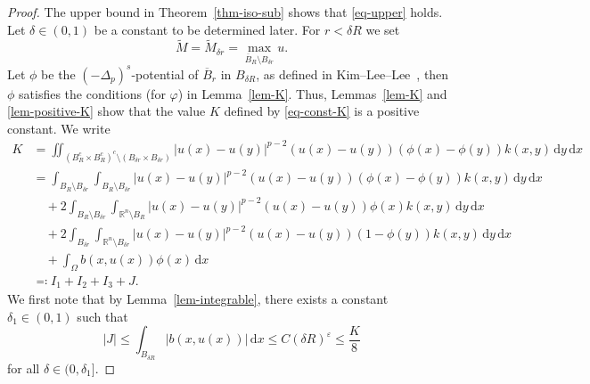 \documentclass[11pt]{amsart}
\theoremstyle{plain}
\theoremstyle{definition}
\numberwithin{equation}{section}
\begin{document}
\begin{proof}
The upper bound in Theorem~\ref{thm-iso-sub} shows that \eqref{eq-upper} holds. Let $\delta \in (0, 1)$ be a constant to be determined later. For $r < \delta R$ we set 
\begin{equation*}
\widetilde{M}=\widetilde{M}_{\delta r}=\max_{\overline{B}_R \setminus B_{\delta r}}u.
\end{equation*}
Let $\phi$ be the $(-\Delta_p)^s$-potential of $\overline{B}_r$ in $B_{\delta R}$, as defined in Kim--Lee--Lee~\cite[Definition~2.15]{KLL23}, then $\phi$ satisfies the conditions (for $\varphi$) in Lemma~\ref{lem-K}. Thus, Lemmas~\ref{lem-K} and \ref{lem-positive-K} show that the value $K$ defined by \eqref{eq-const-K} is a positive constant. We write
\begin{align*}
K
	&= \iint_{(B_{R}^c \times B_{R}^c)^c \setminus (B_{\delta r} \times B_{\delta r})} |u(x)-u(y)|^{p-2}(u(x)-u(y))(\phi(x)-\phi(y)) k(x, y) \,\mathrm{d}y\,\mathrm{d}x \\
	&=\int_{B_{R} \setminus B_{\delta r}} \int_{B_{R} \setminus B_{\delta r}} |u(x)-u(y)|^{p-2}(u(x)-u(y))(\phi(x)-\phi(y)) k(x, y) \,\mathrm{d}y\,\mathrm{d}x \\
	&\quad +2\int_{B_R \setminus B_{\delta r}} \int_{\mathbb{R}^n \setminus B_{R}} |u(x)-u(y)|^{p-2}(u(x)-u(y))\phi(x) k(x, y) \,\mathrm{d}y\,\mathrm{d}x \\
	&\quad +2\int_{B_{\delta r}} \int_{\mathbb{R}^n \setminus B_{\delta r}} |u(x)-u(y)|^{p-2}(u(x)-u(y))(1-\phi(y)) k(x, y) \,\mathrm{d}y\,\mathrm{d}x \\
    &\quad +\int_{\Omega}b(x, u(x))\phi(x)\,\mathrm{d}x\\
	&\eqqcolon I_1+I_2+I_3+J.
\end{align*}
We first note that by Lemma~\ref{lem-integrable}, there exists a constant $\delta_1 \in (0, 1)$ such that 
\begin{equation*}
    |J|\leq \int_{B_{\delta R}} |b(x, u(x))|\,\mathrm{d}x \leq C(\delta R)^{\varepsilon} \leq \frac{K}{8}
\end{equation*}
for all $\delta \in (0, \delta_1]$.


\end{proof}
\end{document}
